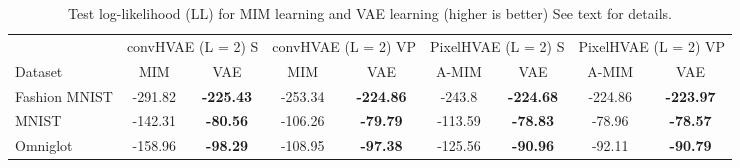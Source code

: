 \begin{table}[t]
    \centering
    \setlength{\tabcolsep}{0.5em} %
    {
    \scriptsize
    \renewcommand{\arraystretch}{1.2}%
    \begin{tabular}{l||c|c||c|c||c|c||c|c||}
         \multicolumn{1}{l||}{} &  \multicolumn{2}{c||}{convHVAE (L = 2) S}  & \multicolumn{2}{c||}{convHVAE (L = 2) VP}  & \multicolumn{2}{c||}{PixelHVAE (L = 2) S}  & \multicolumn{2}{c||}{PixelHVAE (L = 2) VP} \\
         Dataset & {\tiny MIM} &  {\tiny VAE} & {\tiny MIM}  & {\tiny VAE} & {\tiny A-MIM} & {\tiny VAE} & {\tiny A-MIM} & {\tiny VAE}  \\
        \hline
        Fashion MNIST & -291.82 &  \textbf{-225.43} & -253.34 & \textbf{-224.86} & -243.8 & \textbf{-224.68} & -224.86 & \textbf{-223.97} \\
        MNIST         & -142.31 &  \textbf{-80.56} & -106.26 &  \textbf{-79.79}  & -113.59 & \textbf{-78.83} & -78.96 & \textbf{-78.57} \\
        Omniglot      & -158.96 &  \textbf{-98.29} & -108.95 & \textbf{-97.38}  & -125.56 & \textbf{-90.96} & -92.11 & \textbf{-90.79} \\
    \end{tabular}
    }
    \vspace*{0.5cm}
    \caption{Test log-likelihood (LL) for MIM learning and VAE learning (higher is better) See text for details.
    }
    \label{tab:mim-vs-vae-image-quantitative-ll}
\end{table}


